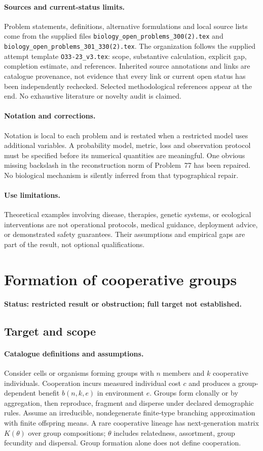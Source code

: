 \documentclass[11pt]{article}
\begin{document}
\paragraph{Sources and current-status limits.}
Problem statements, definitions, alternative formulations and local source lists
come from the supplied files
\texttt{biology\_open\_problems\_300(2).tex} and
\texttt{biology\_open\_problems\_301\_330(2).tex}.
The organization follows the supplied attempt template
\texttt{O33-23\_v3.tex}: scope, substantive calculation, explicit gap,
completion estimate, and references. Inherited source annotations and links are
catalogue provenance, not evidence that every link or current open status has
been independently rechecked. Selected methodological references appear at the
end. No exhaustive literature or novelty audit is claimed.

\paragraph{Notation and corrections.}
Notation is local to each problem and is restated when a restricted model uses
additional variables. A probability model, metric, loss and observation protocol
must be specified before its numerical quantities are meaningful. One obvious
missing backslash in the reconstruction norm of Problem~77 has been repaired.
No biological mechanism is silently inferred from that typographical repair.

\paragraph{Use limitations.}
Theoretical examples involving disease, therapies, genetic systems, or ecological
interventions are not operational protocols, medical guidance, deployment advice,
or demonstrated safety guarantees. Their assumptions and empirical gaps are part
of the result, not optional qualifications.


\section*{Formation of cooperative groups}
\label{prob:150}
\noindent\textbf{Status: restricted result or obstruction; full target not established.}
\subsection{Target and scope}
\paragraph{Catalogue definitions and assumptions.}
Consider cells or organisms forming groups with $n$ members and $k$ cooperative individuals. Cooperation incurs measured individual cost $c$ and produces a group-dependent benefit $b(n,k,e)$ in environment $e$. Groups form clonally or by aggregation, then reproduce, fragment and disperse under declared demographic rules. Assume an irreducible, nondegenerate finite-type branching approximation with finite offspring means. A rare cooperative lineage has next-generation matrix $K(\theta)$ over group compositions; $\theta$ includes relatedness, assortment, group fecundity and dispersal. Group formation alone does not define cooperation.
\end{document}
